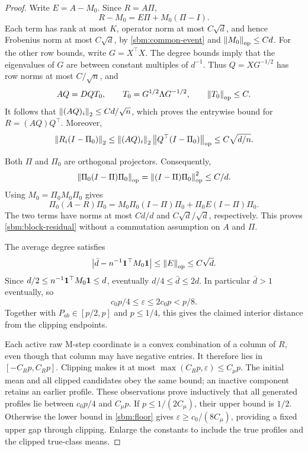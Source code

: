 \begin{proof}
Write $E=A-M_0$. Since $R=A\Pi$,
\[
 R-M_0=E\Pi+M_0(\Pi-I).
\]
Each term has rank at most $K$, operator norm at most $C\sqrt d$, and
hence Frobenius norm at most $C\sqrt d$, by
\eqref{sbm:common-event} and $\left\lVert M_0\right\rVert_{\mathrm{op}}\le Cd$.
For the other row bounds, write $G=X^\top X$. The degree bounds imply
that the eigenvalues of $G$ are between constant multiples of $d^{-1}$.
Thus $Q=XG^{-1/2}$ has row norms at most $C/\sqrt n$, and
\[
 AQ=DQT_0,\qquad T_0=G^{1/2}\Lambda G^{-1/2},\qquad
 \left\lVert T_0\right\rVert_{\mathrm{op}}\le C.
\]
It follows that $\left\lVert(AQ)_i\right\rVert_2\le Cd/\sqrt n$, which proves the
entrywise bound for $R=(AQ)Q^\top$. Moreover,
\[
 \left\lVert R_i(I-\Pi_0)\right\rVert_2
 \le\left\lVert(AQ)_i\right\rVert_2\left\lVert Q^\top(I-\Pi_0)\right\rVert_{\mathrm{op}}
 \le C\sqrt{d/n}.
\]

Both $\Pi$ and $\Pi_0$ are orthogonal projectors. Consequently,
\[
 \left\lVert\Pi_0(I-\Pi)\Pi_0\right\rVert_{\mathrm{op}}
 =\left\lVert(I-\Pi)\Pi_0\right\rVert_{\mathrm{op}}^2\le C/d.
\]
Using $M_0=\Pi_0M_0\Pi_0$ gives
\[
 \Pi_0(A-R)\Pi_0
 =M_0\Pi_0(I-\Pi)\Pi_0+\Pi_0E(I-\Pi)\Pi_0.
\]
The two terms have norms at most $Cd/d$ and
$C\sqrt d/\sqrt d$, respectively. This proves
\eqref{sbm:block-residual} without a commutation assumption on $A$
and $\Pi$.

The average degree satisfies
\[
 \left|\bar d-n^{-1}\mathbf 1^\top M_0\mathbf 1\right|
 \le\left\lVert E\right\rVert_{\mathrm{op}}\le C\sqrt d.
\]
Since $d/2\le n^{-1}\mathbf 1^\top M_0\mathbf 1\le d$, eventually
$d/4\le\bar d\le2d$. In particular $\bar d>1$ eventually, so
\begin{equation}
 c_0p/4\le\varepsilon\le2c_0p<p/8.
 \label{sbm:floor}
\end{equation}
Together with $P_{ab}\in[p/2,p]$ and $p\le1/4$, this gives the claimed
interior distance from the clipping endpoints.

Each active raw M-step coordinate is a convex combination of a column
of $R$, even though that column may have negative entries. It therefore
lies in $[-C_Rp,C_Rp]$. Clipping makes it at most
$\max(C_Rp,\varepsilon)\le C_\mu p$. The initial mean and all clipped
candidates obey the same bound; an inactive component retains an earlier
profile. These observations prove inductively that all generated
profiles lie between $c_0p/4$ and $C_\mu p$. If
$p\le1/(2C_\mu)$, their upper bound is $1/2$. Otherwise the lower
bound in \eqref{sbm:floor} gives
$\varepsilon\ge c_0/(8C_\mu)$, providing a fixed upper gap through
clipping. Enlarge the constants to include the true profiles and the
clipped true-class means.
\end{proof}

